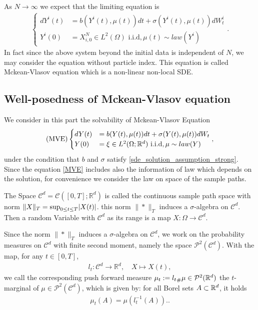  As $N \to \infty$ we expect that the limiting equation is
  \begin{align*}
    \begin{cases}
      dY^{i}(t) &= b(Y^{i}(t) ,\mu(t) ) dt + \sigma(Y^{i}(t),\mu(t) )dW_t^i \\
      Y^{i}(0)  &=  X_{i,0}^{N} \in  L^2(\Omega ) \text{ i.i.d}, \mu(t)\sim law (Y^i)
    \end{cases}
  .\end{align*}
 In fact since the above system beyond the initial data is independent of $N$, we may consider the equation without particle index.
 This equation is called Mckean-Vlasov equation which is a non-linear non-local SDE.
\subsection{Well-posedness of Mckean-Vlasov equation}
 We consider in this part the solvability of Mckean-Vlasov Equation 
\begin{align}\label{MVE}
    \text{(MVE)} \begin{cases}
      dY(t) &= b(Y(t) ,\mu(t) ) dt + \sigma(Y(t),\mu(t) )dW_t \\
      Y(0)  &=  \xi \in  L^2(\Omega;\mathbb{R}^d ) \text{ i.i.d}, \mu\sim law (Y) 
    \end{cases}
,\end{align}  
under the condition that $b$ and $\sigma$ satisfy \autoref{sde_solution_assumption_strong}. Since the equation \autoref{MVE} includes also the information of law which depends on the solution, for convenience we consider the law on space of the sample paths.
\begin{definition}
 The Space  $\mathcal{C}^{d} = \mathcal{C}([0,T];\mathbb{R}^{d} ) $ is called the continuous sample path space with norm 
$  \|X\|_T = \sup_{0\le t \le T} \lvert X(t)\rvert$. 
 this norm $\|*\|_T$ induces a $\sigma$-algebra on $\mathcal{C}^{d} $.
Then a random Variable with $\mathcal{C}^{d} $ as its range is a map $ X : \Omega \to \mathcal{C}^{d} $.
\end{definition}
\begin{definition}
 Since the norm $\|*\|_T$  induces a $\sigma$-algebra on $\mathcal{C}^{d} $, we work on the probability measures on $\mathcal{C}^{d}$ with finite second moment, namely the space $\mathcal{P}^2(\mathcal{C}^{d} )$. With the map, for any $t\in[0,T]$, 
 \begin{align*}
  l_t : \mathcal{C}^{d} \to  \mathbb{R}^{d}, \quad X \mapsto X(t)  
 ,\end{align*}
 we call the corresponding push forward measure $\mu_t:={l_t}_\#\mu\in \mathcal{P}^2(\mathbb{R}^d)$ the $t$-marginal of $\mu\in \mathcal{P}^2(\mathcal{C}^{d} )$, which is given by: for all Borel sets $A\subset\mathbb{R}^d$, it holds
 \begin{align*}
  \mu_t (A)= \mu(l^{-1}_t(A) ).
 .\end{align*}
\end{definition}

